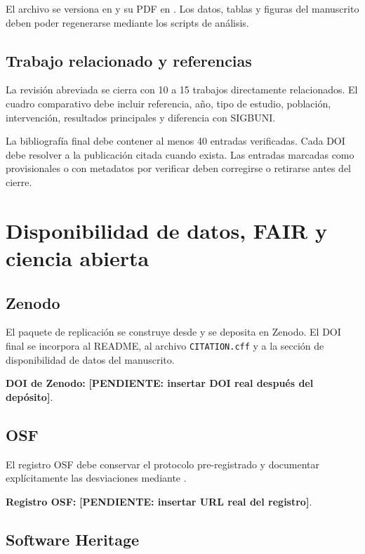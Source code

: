 \documentclass[12pt,journal,onecolumn]{IEEEtran}
\newcommand{\pendiente}[1]{\textcolor{red!70!black}{\textbf{[PENDIENTE: #1]}}}
\begin{document}
El archivo se versiona en  y su PDF
en . Los datos, tablas y figuras del
manuscrito deben poder regenerarse mediante los scripts de análisis.

\subsection{Trabajo relacionado y referencias}

La revisión abreviada se cierra con 10 a 15 trabajos directamente relacionados.
El cuadro comparativo debe incluir referencia, año, tipo de estudio, población,
intervención, resultados principales y diferencia con SIGBUNI.

La bibliografía final debe contener al menos 40 entradas verificadas. Cada DOI
debe resolver a la publicación citada cuando exista. Las entradas marcadas
como provisionales o con metadatos por verificar deben corregirse o retirarse
antes del cierre.

\section{Disponibilidad de datos, FAIR y ciencia abierta}
\label{sec:fair2b}

\subsection{Zenodo}

El paquete de replicación se construye desde
 y se deposita en Zenodo. El DOI final se
incorpora al README, al archivo \texttt{CITATION.cff} y a la sección de
disponibilidad de datos del manuscrito.

\textbf{DOI de Zenodo:}
\pendiente{insertar DOI real después del depósito}.

\subsection{OSF}

El registro OSF debe conservar el protocolo pre-registrado y documentar
explícitamente las desviaciones mediante
.

\textbf{Registro OSF:}
\pendiente{insertar URL real del registro}.

\subsection{Software Heritage}
\end{document}
